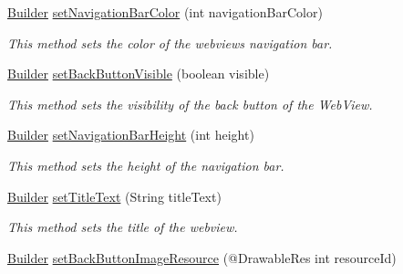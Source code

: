 \begin{DoxyCompactItemize}
\hyperlink{classcom_1_1toast_1_1android_1_1gamebase_1_1_gamebase_web_view_configuration_1_1_builder}{Builder} \hyperlink{classcom_1_1toast_1_1android_1_1gamebase_1_1_gamebase_web_view_configuration_1_1_builder_ad4bfda3f28f8019370a801664a98fbdb}{set\+Navigation\+Bar\+Color} (int navigation\+Bar\+Color)
\begin{DoxyCompactList}\small\item\em This method sets the color of the webview\textquotesingle{}s navigation bar. \end{DoxyCompactList}\item 
\hyperlink{classcom_1_1toast_1_1android_1_1gamebase_1_1_gamebase_web_view_configuration_1_1_builder}{Builder} \hyperlink{classcom_1_1toast_1_1android_1_1gamebase_1_1_gamebase_web_view_configuration_1_1_builder_ab38e9488fc37d4133b3e0242d6678224}{set\+Back\+Button\+Visible} (boolean visible)
\begin{DoxyCompactList}\small\item\em This method sets the visibility of the back button of the Web\+View. \end{DoxyCompactList}\item 
\hyperlink{classcom_1_1toast_1_1android_1_1gamebase_1_1_gamebase_web_view_configuration_1_1_builder}{Builder} \hyperlink{classcom_1_1toast_1_1android_1_1gamebase_1_1_gamebase_web_view_configuration_1_1_builder_ad06d67d94757d454f90270d275f45547}{set\+Navigation\+Bar\+Height} (int height)
\begin{DoxyCompactList}\small\item\em This method sets the height of the navigation bar. \end{DoxyCompactList}\item 
\hyperlink{classcom_1_1toast_1_1android_1_1gamebase_1_1_gamebase_web_view_configuration_1_1_builder}{Builder} \hyperlink{classcom_1_1toast_1_1android_1_1gamebase_1_1_gamebase_web_view_configuration_1_1_builder_a819ccb30c3109c78a022da8f5d4a138c}{set\+Title\+Text} (String title\+Text)
\begin{DoxyCompactList}\small\item\em This method sets the title of the webview. \end{DoxyCompactList}\item 
\hyperlink{classcom_1_1toast_1_1android_1_1gamebase_1_1_gamebase_web_view_configuration_1_1_builder}{Builder} \hyperlink{classcom_1_1toast_1_1android_1_1gamebase_1_1_gamebase_web_view_configuration_1_1_builder_a9c364e3b1f41dfe4acc8ace444490168}{set\+Back\+Button\+Image\+Resource} (@Drawable\+Res int resource\+Id)

\end{DoxyCompactItemize}
